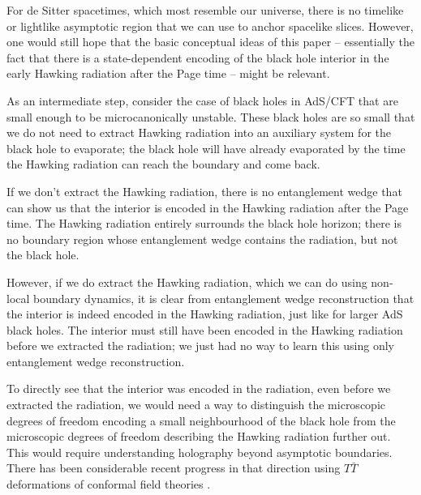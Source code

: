 \documentclass[11pt,a4paper]{article}
\begin{document}
For de Sitter spacetimes, which most resemble our universe, there is no timelike or lightlike asymptotic region that we can use to anchor spacelike slices. However, one would still hope that the basic conceptual ideas of this paper -- essentially the fact that there is a state-dependent encoding of the black hole interior in the early Hawking radiation after the Page time -- might be relevant.

As an intermediate step, consider the case of black holes in AdS/CFT that are small enough to be microcanonically unstable. These black holes are so small that we do not need to extract Hawking radiation into an auxiliary system for the black hole to evaporate; the black hole will have already evaporated by the time the Hawking radiation can reach the boundary and come back.

If we don't extract the Hawking radiation, there is no entanglement wedge that can show us that the interior is encoded in the Hawking radiation after the Page time. The Hawking radiation entirely surrounds the black hole horizon; there is no boundary region whose entanglement wedge contains the radiation, but not the black hole.

However, if we do extract the Hawking radiation, which we can do using non-local boundary dynamics, it is clear from entanglement wedge reconstruction that the interior is indeed encoded in the Hawking radiation, just like for larger AdS black holes. The interior must still have been encoded in the Hawking radiation before we extracted the radiation; we just had no way to learn this using only entanglement wedge reconstruction.

To directly see that the interior was encoded in the radiation, even before we extracted the radiation, we would need a way to distinguish the microscopic degrees of freedom encoding a small neighbourhood of the black hole from the microscopic degrees of freedom describing the Hawking radiation further out. This would require understanding holography beyond asymptotic boundaries. There has been considerable recent progress in that direction using $T \bar T$ deformations of conformal field theories \cite{cavaglia2016mathrm, mcgough2018moving, kraus2018cutoff, donnelly2018entanglement, gorbenko2018ds}.
\end{document}

